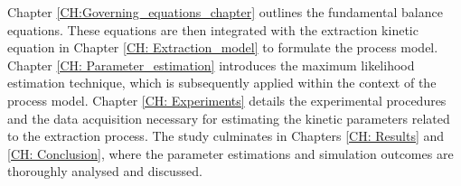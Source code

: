 \documentclass[../Article_Model_Parameters.tex]{subfiles}
\begin{document}
	Chapter \ref{CH:Governing_equations_chapter} outlines the fundamental balance equations. These equations are then integrated with the extraction kinetic equation in Chapter \ref{CH: Extraction_model} to formulate the process model. Chapter \ref{CH: Parameter_estimation} introduces the maximum likelihood estimation technique, which is subsequently applied within the context of the process model. Chapter \ref{CH: Experiments} details the experimental procedures and the data acquisition necessary for estimating the kinetic parameters related to the extraction process. The study culminates in Chapters \ref{CH: Results} and \ref{CH: Conclusion}, where the parameter estimations and simulation outcomes are thoroughly analysed and discussed.
		
\end{document}
